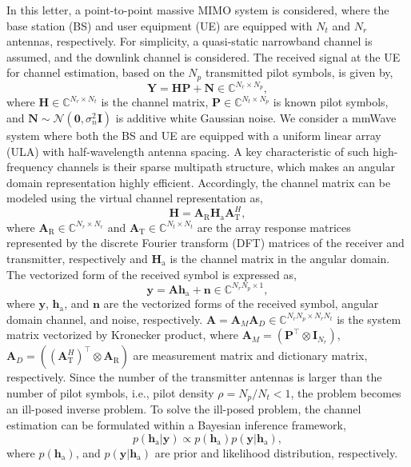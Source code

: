 \documentclass[lettersize,journal]{IEEEtran}
\begin{document}
In this letter, a point-to-point massive MIMO system is considered, where the base station (BS) and user equipment (UE) are equipped with $N_{t}$ and $N_{r}$ antennas, respectively. For simplicity, a quasi-static narrowband channel is assumed, and the downlink channel is considered. The received signal at the UE for channel estimation, based on the $N_{p}$ transmitted pilot symbols, is given by,
\begin{equation}
\mathbf{Y}=\mathbf{H}\mathbf{P}+\mathbf{N}\in \mathbb{C}^{N_{r}\times N_{p}},
\end{equation}
where $\mathbf{H}\in \mathbb{C}^{N_{r}\times N_{t}}$ is the channel matrix, $\mathbf{P}\in \mathbb{C}^{N_{t}\times N_{p}}$ is known pilot symbols, and $\mathbf{N}\sim\mathcal{N}(\mathbf{0},\sigma^{2}_{n}\mathbf{I})$ is additive white Gaussian noise. We consider a mmWave system where both the BS and UE are equipped with a uniform linear array (ULA) with half-wavelength antenna spacing. A key characteristic of such high-frequency channels is their sparse multipath structure, which makes an angular domain representation highly efficient. Accordingly, the channel matrix can be modeled using the virtual channel representation as,
\begin{equation}
\mathbf{H} = \mathbf{A}_{\text{R}}\mathbf{H}_{\text{a}}\mathbf{A}_{\text{T}}^{H},
\end{equation}
where $\mathbf{A}_{\text{R}}\in \mathbb{C}^{N_{r}\times N_{r}}$ and $\mathbf{A}_{\text{T}}\in \mathbb{C}^{N_{t}\times N_{t}}$ are the array response matrices represented by the discrete Fourier transform (DFT) matrices of the receiver and transmitter, respectively and $\mathbf{H}_{\text{a}}$ is the channel matrix in the angular domain.
The vectorized form of the received symbol is expressed as,
\begin{equation}
\mathbf{y} = \mathbf{A}\mathbf{h}_{\text{a}}+\mathbf{n}\in \mathbb{C}^{N_{r}N_{p}\times 1},
\end{equation}
where $\mathbf{y}$, $\mathbf{h}_{\text{a}}$, and $\mathbf{n}$ are the vectorized forms of the received symbol, angular domain channel, and noise, respectively. $\mathbf{A}=\mathbf{A}_{M}\mathbf{A}_{D}\in \mathbb{C}^{N_{r}N_{p}\times N_{r}N_{t}}$ is the system matrix vectorized by Kronecker product, where $\mathbf{A}_{M} = (\mathbf{P}^{\top}\otimes\mathbf{I}_{N_{r}})$, $\mathbf{A}_{D}=((\mathbf{A}_{\text{T}}^{H})^{\top}\otimes \mathbf{A}_{\text{R}})$ are measurement matrix and dictionary matrix, respectively.
Since the number of the transmitter antennas is larger than the number of pilot symbols, i.e., pilot density $\rho=N_{p}/N_{t}<1$, the problem becomes an ill-posed inverse problem.
To solve the ill-posed problem, the channel estimation can be formulated within a Bayesian inference framework,
\begin{equation}
  p(\mathbf{h}_{\text{a}}|\mathbf{y})\propto p(\mathbf{h}_{\text{a}})p(\mathbf{y}|\mathbf{h}_{\text{a}}),
\end{equation}
where $p(\mathbf{h}_{\text{a}})$, and $p(\mathbf{y}|\mathbf{h}_{\text{a}})$ are prior and likelihood distribution, respectively.
\end{document}
